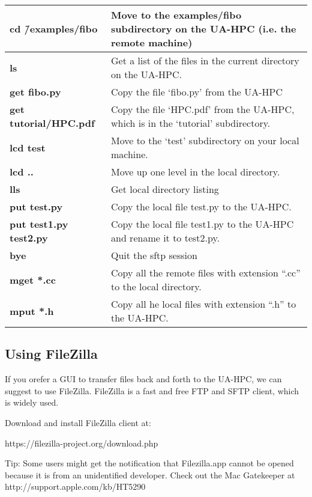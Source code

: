 \begin{tabular}{|p{1.2in}|p{2.9in}|} \hline
\textbf{cd \~/examples/fibo} & Move to the examples/fibo subdirectory on the UA-HPC (i.e. the remote machine)\\  \hline
\textbf{ls} & Get a list of the files in the current directory on the UA-HPC. \\ \hline
\textbf{get fibo.py} & Copy the file `fibo.py' from the UA-HPC \\ \hline
\textbf{get tutorial/HPC.pdf} & Copy the file `HPC.pdf' from the UA-HPC, which is in the `tutorial' subdirectory. \\ \hline
\textbf{lcd test} & Move to the `test' subdirectory on your local machine. \\ \hline
\textbf{lcd ..} & Move up one level in the local directory. \\ \hline
\textbf{lls} & Get local directory listing \\ \hline
\textbf{put test.py} & Copy the local file test.py to the UA-HPC. \\ \hline
\textbf{put test1.py test2.py } & Copy the local file test1.py to the UA-HPC and rename it to test2.py. \\ \hline
\textbf{bye} & Quit the sftp session \\ \hline
\textbf{mget *.cc} & Copy all the remote files with extension ``.cc'' to the local directory.  \\ \hline
\textbf{mput *.h} & Copy all he local files with extension ``.h'' to the UA-HPC. \\ \hline
\end{tabular}


\subsection{Using FileZilla}

If you orefer a GUI to transfer files back and forth to the UA-HPC, we can suggest to use FileZilla. FileZilla is a fast and free FTP and SFTP client, which is widely used.



Download and install FileZilla client at:

https://filezilla-project.org/download.php\textit{}

\textit{}

Tip: Some users might get the notification that Filezilla.app cannot be opened because it is from an unidentified developer. Check out the Mac Gatekeeper at http://support.apple.com/kb/HT5290

